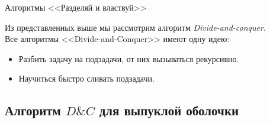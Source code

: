     \begin{frame}{Алгоритмы <<Разделяй и властвуй>>}

        Из представленных выше мы рассмотрим алгоритм {\it Divide-and-conquer}. \\

        Все алгоритмы <<Divide-and-Conquer>> имеют одну идею:

        \begin{itemize}

            \item Разбить задачу на подзадачи, от них вызываться рекурсивно.

            \item Научиться быстро сливать подзадачи.

        \end{itemize}

    \end{frame}

    \subsection{Алгоритм $D\&C$ для выпуклой оболочки}

